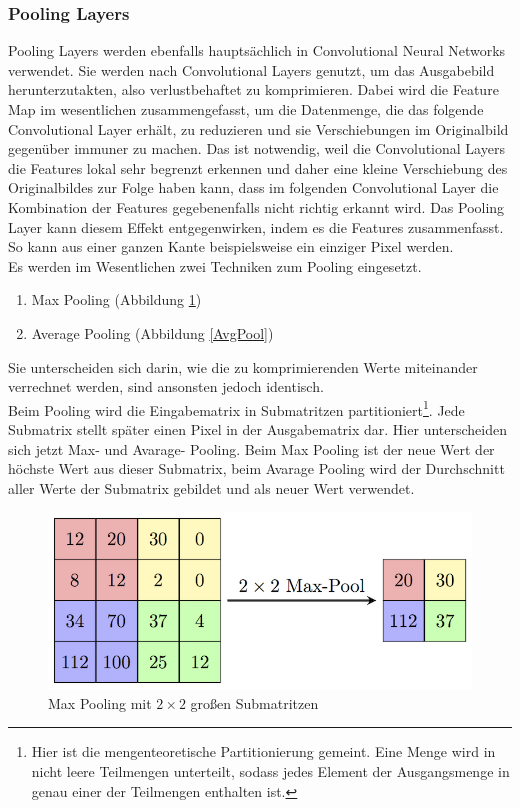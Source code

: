 \documentclass[11pt]{article}
\begin{document}
\subsubsection{Pooling Layers}
Pooling Layers werden ebenfalls hauptsächlich in Convolutional Neural Networks verwendet. Sie werden nach Convolutional Layers genutzt, um das Ausgabebild herunterzutakten, also verlustbehaftet zu komprimieren. Dabei wird die Feature Map im wesentlichen zusammengefasst, um die Datenmenge, die das folgende Convolutional Layer erhält, zu reduzieren und sie Verschiebungen im Originalbild gegenüber immuner zu machen. Das ist notwendig, weil die Convolutional Layers die Features lokal sehr begrenzt erkennen und daher eine kleine Verschiebung des Originalbildes zur Folge haben kann, dass im folgenden Convolutional Layer die Kombination der Features gegebenenfalls nicht richtig erkannt wird. Das Pooling Layer kann diesem Effekt entgegenwirken, indem es die Features zusammenfasst. So kann aus einer ganzen Kante beispielsweise ein einziger Pixel werden.\\
Es werden im Wesentlichen zwei Techniken zum Pooling eingesetzt. 
\begin{enumerate}
	\item Max Pooling (Abbildung \ref{Maxpool})
	\item Average Pooling (Abbildung \ref{AvgPool})
\end{enumerate}
Sie unterscheiden sich darin, wie die zu komprimierenden Werte miteinander verrechnet werden, sind ansonsten jedoch identisch.\\
Beim Pooling wird die Eingabematrix in Submatritzen partitioniert\footnote{Hier ist die mengenteoretische Partitionierung gemeint. Eine Menge wird in nicht leere Teilmengen unterteilt, sodass jedes Element der Ausgangsmenge in genau einer der Teilmengen enthalten ist.}. Jede Submatrix stellt später einen Pixel in der Ausgabematrix dar. Hier unterscheiden sich jetzt Max- und Avarage- Pooling. Beim Max Pooling ist der neue Wert der höchste Wert aus dieser Submatrix, beim Avarage Pooling wird der Durchschnitt aller Werte der Submatrix gebildet und als neuer Wert verwendet.
\begin{figure}[h]
	\centering
	\includegraphics[width=0.7\linewidth]{../graphics/MaxpoolSample2.png}
	\caption[Max Pooling mit $2\times2$ großen Submatritzen\newline
	Quelle: https://computersciencewiki.org/index.php/Max-pooling\_/\_Pooling\\
	CC BY NC SA Lizenz]{Max Pooling mit $2\times2$ großen Submatritzen}
	\label{Maxpool}
\end{figure}
\end{document}
